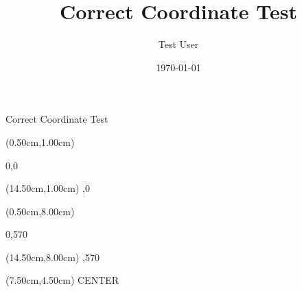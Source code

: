 \documentclass[aspectratio=169,xcolor=dvipsnames,professionalfonts]{beamer}
\title{Correct Coordinate Test}
\author{Test User}
\date{\today}
\begin{document}
\begin{frame}
\titlepage
\end{frame}

\begin{frame}{Correct Coordinate Test}

\begin{textblock*}{2.00cm}(0.50cm,1.00cm)
{\fontsize{12}{14.4}\selectfont\raggedright 0,0}
\end{textblock*}

\begin{textblock*}{2.00cm}(14.50cm,1.00cm)
{\fontsize{12}{14.4}\selectfont{},0}
\end{textblock*}

\begin{textblock*}{2.00cm}(0.50cm,8.00cm)
{\fontsize{12}{14.4}\selectfont\raggedright 0,570}
\end{textblock*}

\begin{textblock*}{2.00cm}(14.50cm,8.00cm)
{\fontsize{12}{14.4}\selectfont{},570}
\end{textblock*}

\begin{textblock*}{2.00cm}(7.50cm,4.50cm)
{\fontsize{12}{14.4}\selectfont\centering CENTER}
\end{textblock*}
\end{frame}
\end{document}
